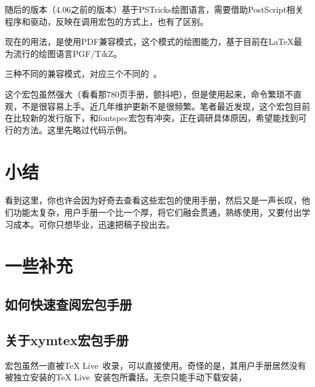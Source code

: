 \documentclass[a4paper,UTF8,zihao = -4]{ctexart} %
\providecommand{\tikzlg}{PGF/T\textit{i}kZ}
\begin{document}
\begin{dispListing}
\usepackage{xymtem} %
\end{dispListing}

随后的版本（4.06之前的版本）基于PSTricks绘图语言，需要借助PostScript相关程序和驱动，反映在调用宏包的方式上，也有了区别。

\begin{dispListing}
\usepackage{xymtexps} %
\end{dispListing}

现在的用法，是使用PDF兼容模式，这个模式的绘图能力，基于目前在\LaTeX{}最为流行的绘图语言\tikzlg{}。

\begin{dispListing}
\end{dispListing}

三种不同的兼容模式，对应三个不同的~。

这个宏包虽然强大（看看那780页手册，颤抖吧），但是使用起来，命令繁琐不直观，不是很容易上手。近几年维护更新不是很频繁。笔者最近发现，这个宏包目前在比较新的发行版下，和\textsf{fontspec}宏包有冲突，正在调研具体原因，希望能找到可行的方法。这里先略过代码示例。


\section*{小结}
\label{sec:conclusion}

看到这里，你也许会因为好奇去查看这些宏包的使用手册，然后又是一声长叹，他们功能太复杂，用户手册一个比一个厚，将它们融会贯通，熟练使用，又要付出学习成本。可你只想毕业，迅速把稿子投出去。

\section*{一些补充}
\label{sec:miscellaneous}


\subsection*{如何快速查阅宏包手册}
\label{sec:texdoc}



\subsection*{关于\textsf{xymtex}宏包手册} %
\label{sec:xymtexDoc}
\XyMTeX{}宏包虽然一直被\TeX{} Live~收录，可以直接使用。奇怪的是，其用户手册居然没有被独立安装的\TeX{} Live~安装包所囊括。无奈只能手动下载安装，
\end{document}
